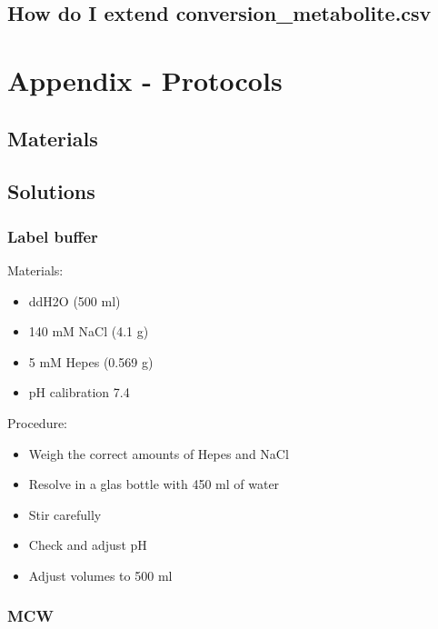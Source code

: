\documentclass[]{book}
\providecommand{\tightlist}{%
  \setlength{\itemsep}{0pt}\setlength{\parskip}{0pt}}
\begin{document}
\hypertarget{how-do-i-extend-conversion_metabolite.csv}{%
\section{How do I extend conversion\_metabolite.csv}\label{how-do-i-extend-conversion_metabolite.csv}}

\hypertarget{protocols}{%
\chapter{Appendix - Protocols}\label{protocols}}

\hypertarget{materials}{%
\section{Materials}\label{materials}}

\hypertarget{solutions}{%
\section{Solutions}\label{solutions}}

\hypertarget{washingbuffer}{%
\subsection{Label buffer}\label{washingbuffer}}

Materials:

\begin{itemize}
\tightlist
\item
  ddH2O (500 ml)
\item
  140 mM NaCl (4.1 g)
\item
  5 mM Hepes (0.569 g)
\item
  pH calibration 7.4
\end{itemize}

Procedure:

\begin{itemize}
\tightlist
\item
  Weigh the correct amounts of Hepes and NaCl
\item
  Resolve in a glas bottle with 450 ml of water
\item
  Stir carefully
\item
  Check and adjust pH
\item
  Adjust volumes to 500 ml
\end{itemize}

\hypertarget{mcw}{%
\subsection{MCW}\label{mcw}}
\end{document}
